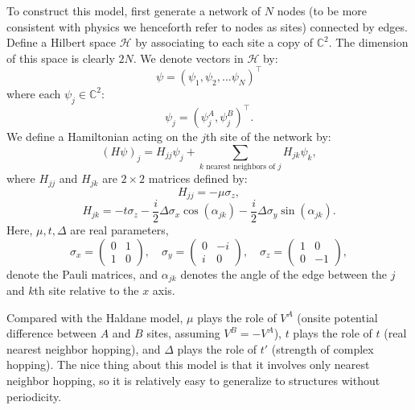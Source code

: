 \documentclass[a4paper]{article}
\begin{document}
To construct this model, first generate a network of $N$ nodes (to be more consistent with physics we henceforth refer to nodes as sites) connected by edges. Define a Hilbert space $\mathcal{H}$ by associating to each site a copy of $\mathbb{C}^2$. The dimension of this space is clearly $2 N$. We denote vectors in $\mathcal{H}$ by:
\begin{equation}
	\psi = \left( \psi_1, \psi_2, ... \psi_N \right)^\top
\end{equation}
where each $\psi_j \in \mathbb{C}^2$:
\begin{equation}
	\psi_j = \left( \psi_j^A , \psi_j^B \right)^\top.
\end{equation}
We define a Hamiltonian acting on the $j$th site of the network by:
\begin{equation}
	( H \psi )_j = H_{jj} \psi_j + \sum_{ k \text{ nearest neighbors of } j } H_{jk} \psi_k,
\end{equation}
where $H_{jj}$ and $H_{jk}$ are $2 \times 2$ matrices defined by:
\begin{equation}
	H_{jj} = - \mu \sigma_z,
\end{equation}
\begin{equation}
	H_{jk} = - t \sigma_z - \frac{ i }{ 2 } \Delta \sigma_x \cos( \alpha_{jk} ) - \frac{ i }{ 2 } \Delta \sigma_y \sin( \alpha_{jk} ).
\end{equation}
Here, $\mu, t, \Delta$ are real parameters,
\begin{equation}
	\sigma_x = \begin{pmatrix} 0 & 1 \\ 1 & 0 \end{pmatrix}, \quad \sigma_y = \begin{pmatrix} 0 & - i \\ i & 0 \end{pmatrix}, \quad \sigma_z = \begin{pmatrix} 1 & 0 \\ 0 & -1 \end{pmatrix},
\end{equation}
denote the Pauli matrices, and $\alpha_{jk}$ denotes the angle of the edge between the $j$ and $k$th site relative to the $x$ axis.%

Compared with the Haldane model, $\mu$ plays the role of $V^A$ (onsite potential difference between $A$ and $B$ sites, assuming $V^B = - V^A$), $t$ plays the role of $t$ (real nearest neighbor hopping), and $\Delta$ plays the role of $t'$ (strength of complex hopping). The nice thing about this model is that it involves only nearest neighbor hopping, so it is relatively easy to generalize to structures without periodicity.
\end{document}
